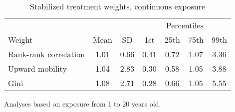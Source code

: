 \begin{table}[htp]
\centering
\footnotesize
\setlength{\tabcolsep}{10pt}
\renewcommand{\arraystretch}{1}
\begin{threeparttable}
\centering
\caption{Stabilized treatment weights, continuous exposure} 
\label{tab:psid_ipt_weigths_z}
\begin{tabular}{lcccccc}
  \hline
\multicolumn{3}{c}{} & \multicolumn{4}{c}{Percentiles} \\ 
 \cmidrule{4-7} 
Weight & Mean & SD & 1st & 25th & 75th & 99th \\ 
  \hline
Rank-rank correlation & 1.01 & 0.66 & 0.41 & 0.72 & 1.07 & 3.36 \\ 
  Upward mobility & 1.04 & 2.83 & 0.30 & 0.58 & 1.05 & 3.88 \\ 
  Gini & 1.08 & 2.71 & 0.28 & 0.66 & 1.05 & 5.55 \\ 
   \hline
\end{tabular}
\begin{tablenotes}
\footnotesize
\item Analyses based on exposure from 1 to 20 years old. 
\end{tablenotes}
\end{threeparttable}
\end{table}
